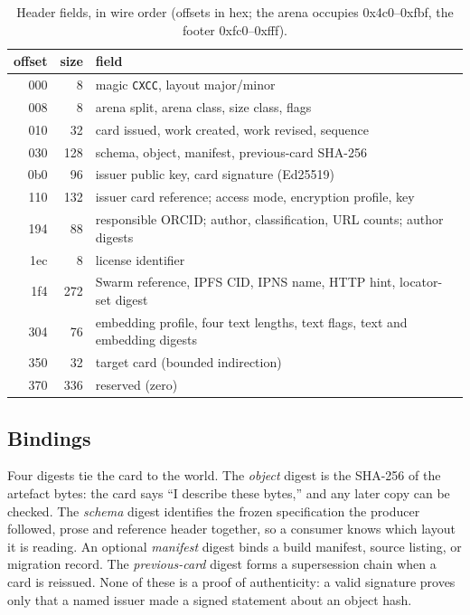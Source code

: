 \documentclass[sigconf]{acmart}
\begin{document}
\begin{table}[t]
\caption{Header fields, in wire order (offsets in hex; the arena occupies
0x4c0--0xfbf, the footer 0xfc0--0xfff).}
\label{tab:layout}
\footnotesize
\begin{tabular}{@{}rrp{}@{}}
\toprule
offset & size & field \\
\midrule
000 & 8   & magic \texttt{CXCC}, layout major/minor \\
008 & 8   & arena split, arena class, size class, flags \\
010 & 32  & card issued, work created, work revised, sequence \\
030 & 128 & schema, object, manifest, previous-card SHA-256 \\
0b0 & 96  & issuer public key, card signature (Ed25519) \\
110 & 132 & issuer card reference; access mode, encryption profile, key \\
194 & 88  & responsible ORCID; author, classification, URL counts; author digests \\
1ec & 8   & license identifier \\
1f4 & 272 & Swarm reference, IPFS CID, IPNS name, HTTP hint, locator-set digest \\
304 & 76  & embedding profile, four text lengths, text flags, text and embedding digests \\
350 & 32  & target card (bounded indirection) \\
370 & 336 & reserved (zero) \\
\bottomrule
\end{tabular}
\end{table}

\subsection{Bindings}

Four digests tie the card to the world. The \emph{object} digest is the SHA-256
of the artefact bytes: the card says ``I describe these bytes,'' and any later
copy can be checked. The \emph{schema} digest identifies the frozen
specification the producer followed, prose and reference header together, so a
consumer knows which layout it is reading. An optional \emph{manifest} digest
binds a build manifest, source listing, or migration record. The
\emph{previous-card} digest forms a supersession chain when a card is reissued.
None of these is a proof of authenticity: a valid signature proves only that a
named issuer made a signed statement about an object hash.
\end{document}
